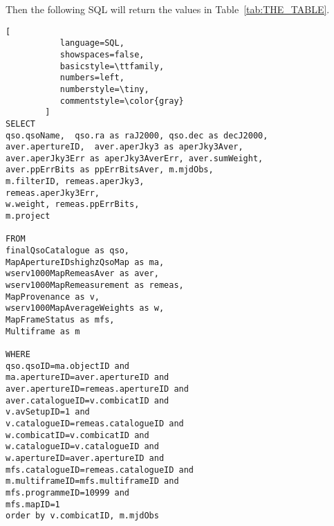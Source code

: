 \lstset{upquote=true}

\noindent
Then the following SQL will return the values in
Table~\ref{tab:THE_TABLE}.

\begin{lstlisting}[
           language=SQL,
           showspaces=false,
           basicstyle=\ttfamily,
           numbers=left,
           numberstyle=\tiny,
           commentstyle=\color{gray}
        ]
SELECT 
qso.qsoName,  qso.ra as raJ2000, qso.dec as decJ2000, 
aver.apertureID,  aver.aperJky3 as aperJky3Aver, 
aver.aperJky3Err as aperJky3AverErr, aver.sumWeight, 
aver.ppErrBits as ppErrBitsAver, m.mjdObs, 
m.filterID, remeas.aperJky3, 
remeas.aperJky3Err, 
w.weight, remeas.ppErrBits, 
m.project

FROM 
finalQsoCatalogue as qso,  
MapApertureIDshighzQsoMap as ma,  
wserv1000MapRemeasAver as aver,  
wserv1000MapRemeasurement as remeas,  
MapProvenance as v,  
wserv1000MapAverageWeights as w, 
MapFrameStatus as mfs, 
Multiframe as m  

WHERE 
qso.qsoID=ma.objectID and 
ma.apertureID=aver.apertureID and 
aver.apertureID=remeas.apertureID and 
aver.catalogueID=v.combicatID and 
v.avSetupID=1 and 
v.catalogueID=remeas.catalogueID and 
w.combicatID=v.combicatID and 
w.catalogueID=v.catalogueID and 
w.apertureID=aver.apertureID and 
mfs.catalogueID=remeas.catalogueID and 
m.multiframeID=mfs.multiframeID and 
mfs.programmeID=10999 and 
mfs.mapID=1 
order by v.combicatID, m.mjdObs
\end{lstlisting}
